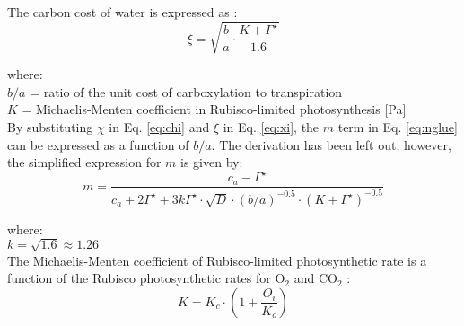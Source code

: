\noindent The carbon cost of water is expressed as \parencite{prentice14}:
%
\begin{equation}
\label{eq:xi}
    \xi = \sqrt{\frac{b}{a} \cdot \frac{K + \Gamma^{\star}}{1.6}}
\end{equation}

\noindent where: \\
\indent $b/a$ = ratio of the unit cost of carboxylation to transpiration\\
\indent $K$ = Michaelis-Menten coefficient in Rubisco-limited photosynthesis [Pa]\\

\noindent By substituting $\chi$ in Eq. \ref{eq:chi} and $\xi$ in Eq. \ref{eq:xi}, the $m$ term in Eq. \ref{eq:nglue} can be expressed as a function of $b/a$.  
The derivation has been left out; however, the simplified expression for $m$ is given by:
\begin{equation}
\label{eq:msimp}
    m = \frac{c_a - \Gamma^{\star}}{c_a + 2 \Gamma^{\star} 
    + 3 k \Gamma^{\star} \cdot \sqrt{D} \cdot 
    \left( b/a \right)^{-0.5} \cdot \left( K + \Gamma^{\star} \right)^{-0.5}}
\end{equation}

\noindent where: \\
\indent $k = \sqrt{1.6} \approx 1.26$ \\

The Michaelis-Menten coefficient of Rubisco-limited photosynthetic rate is a function of the Rubisco photosynthetic rates for O$_2$ and CO$_2$ \parencite{farquhar80}:
%
%
\begin{equation}
\label{eq:michaelis}
	K=K_c \cdot \left( 1 + \frac{O_i}{K_o} \right)
\end{equation}


